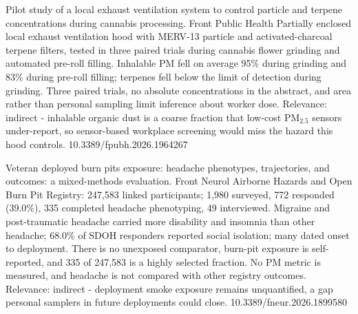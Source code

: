 \documentclass[10pt]{article}
\begin{document}
\par{}\baselineskip{}\baselineskip
{}

{Pilot study of a local exhaust ventilation system to control particle and terpene concentrations during cannabis processing.}
{Front Public Health}
{Partially enclosed local exhaust ventilation hood with MERV-13 particle and activated-charcoal terpene filters, tested in three paired trials during cannabis flower grinding and automated pre-roll filling. Inhalable PM fell on average 95\% during grinding and 83\% during pre-roll filling; terpenes fell below the limit of detection during grinding. Three paired trials, no absolute concentrations in the abstract, and area rather than personal sampling limit inference about worker dose. Relevance: indirect - inhalable organic dust is a coarse fraction that low-cost PM$_{2.5}$ sensors under-report, so sensor-based workplace screening would miss the hazard this hood controls.}
{10.3389/fpubh.2026.1964267}

{Veteran deployed burn pits exposure: headache phenotypes, trajectories, and outcomes: a mixed-methods evaluation.}
{Front Neurol}
{Airborne Hazards and Open Burn Pit Registry: 247,583 linked participants; 1,980 surveyed, 772 responded (39.0\%), 335 completed headache phenotyping, 49 interviewed. Migraine and post-traumatic headache carried more disability and insomnia than other headache; 68.0\% of SDOH responders reported social isolation; many dated onset to deployment. There is no unexposed comparator, burn-pit exposure is self-reported, and 335 of 247,583 is a highly selected fraction. No PM metric is measured, and headache is not compared with other registry outcomes. Relevance: indirect - deployment smoke exposure remains unquantified, a gap personal samplers in future deployments could close.}
{10.3389/fneur.2026.1899580}

\par{}\baselineskip{}\baselineskip
{}
\end{document}
